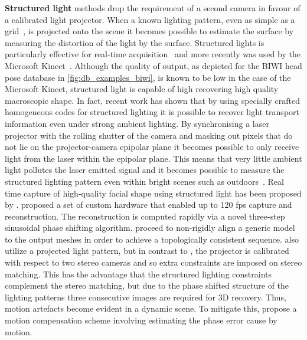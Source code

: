 \textbf{Structured light} methods drop the requirement of a second camera in
favour of a calibrated light projector. When a known lighting pattern, even as
simple as a grid~\cite{will1971grid}, is projected onto the scene it becomes
possible to estimate the surface by measuring the distortion of the light by the
surface. Structured lights is particularly effective for real-time
acquisition~\cite{rusinkiewicz2002real} and more recently was used by the
Microsoft Kinect~\cite{zhang2012microsoft}. Although the quality of output, as
depicted for the BIWI head pose database in
\cref{fig:db_examples_biwi}, is known to be low in the case of the Microsoft
Kinect, structured light is capable of high recovering high quality macroscopic
shape. In fact, recent work has shown that by using specially crafted
homogeneous codes for structured lighting it is possible to recover light
transport information even under strong ambient lighting.
By synchronising a laser projector with the rolling shutter of the camera and
masking out pixels that do not lie on the projector-camera epipolar plane it
becomes possible to only receive light from the laser within the epipolar plane.
This means that very little ambient light pollutes the laser emitted
signal and it becomes possible to measure the structured lighting pattern
even within bright scenes such as outdoors~\cite{o2015homogeneous}.
Real time capture of high-quality facial shape using
structured light has been proposed by \citet{zhang2006high,weise2007fast}.
\citet{zhang2006high,wang2004high} proposed a set of custom hardware that
enabled up to 120 fps capture and reconstruction. The reconstruction is computed
rapidly via a novel three-step sinusoidal phase shifting algorithm.
\citet{zhang2006high} proceed to non-rigidly align a generic model to the output
meshes in order to achieve a topologically consistent sequence.
\citet{weise2007fast} also utilize a projected light pattern, but in contrast to
\citet{zhang2006high}, the projector is calibrated with respect to two stereo
cameras and so extra constraints are imposed on stereo matching. This has the
advantage that the structured lighting constraints complement the stereo
matching, but due to the phase shifted structure of the lighting patterns three
consecutive images are required for 3D recovery. Thus, motion artefacts become
evident in a dynamic scene. To mitigate this, \citet{weise2007fast} propose a
motion compensation scheme involving estimating the phase error cause by motion.

